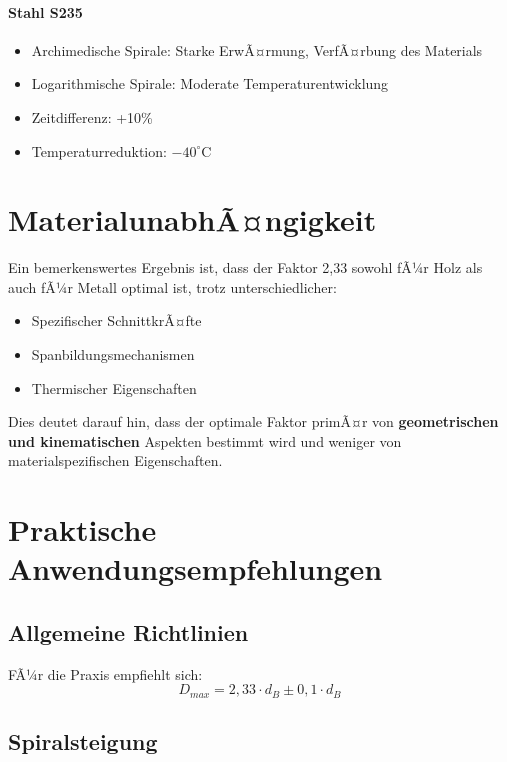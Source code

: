 ﻿\documentclass[12pt,a4paper]{article}
\begin{document}
\paragraph{Stahl S235}
\begin{itemize}
	\item Archimedische Spirale: Starke ErwÃ¤rmung, VerfÃ¤rbung des Materials
	\item Logarithmische Spirale: Moderate Temperaturentwicklung
	\item Zeitdifferenz: +10\%
	\item Temperaturreduktion: $-40^\circ\text{C}$
\end{itemize}

\section{MaterialunabhÃ¤ngigkeit}

Ein bemerkenswertes Ergebnis ist, dass der Faktor 2,33 sowohl fÃ¼r Holz als auch fÃ¼r Metall optimal ist, trotz unterschiedlicher:
\begin{itemize}
	\item Spezifischer SchnittkrÃ¤fte
	\item Spanbildungsmechanismen
	\item Thermischer Eigenschaften
\end{itemize}

Dies deutet darauf hin, dass der optimale Faktor primÃ¤r von \textbf{geometrischen und kinematischen} Aspekten bestimmt wird und weniger von materialspezifischen Eigenschaften.

\section{Praktische Anwendungsempfehlungen}

\subsection{Allgemeine Richtlinien}

FÃ¼r die Praxis empfiehlt sich:
\begin{equation}
	D_{max} = 2{,}33 \cdot d_B \pm 0{,}1 \cdot d_B
\end{equation}

\subsection{Spiralsteigung}
\end{document}
